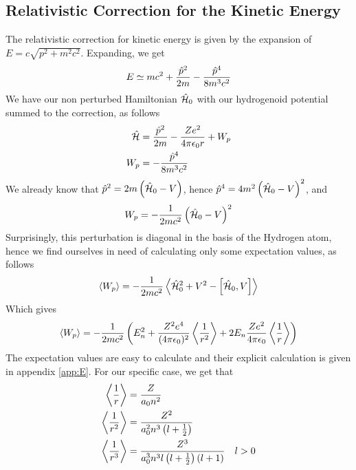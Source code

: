 \documentclass[../qm.tex]{subfiles}
\begin{document}
	\subsection{Relativistic Correction for the Kinetic Energy}
	The relativistic correction for kinetic energy is given by the expansion of $E=c\sqrt{p^2+m^2c^2}$. Expanding, we get
	\begin{equation}
		E\simeq mc^2+\frac{\hat{p}^2}{2m}-\frac{\hat{p}^4}{8m^3c^2}
		\label{eq:energypowerseries}
	\end{equation}
	We have our non perturbed Hamiltonian $\hat{\mathcal{H}}_0$ with our hydrogenoid potential summed to the correction, as follows
	\begin{equation}
		\begin{aligned}
			\hat{\mathcal{H}}&=\frac{\hat{p}^2}{2m}-\frac{Ze^2}{4\pi\epsilon_0r}+W_p\\
			W_p&=-\frac{\hat{p}^4}{8m^3c^2}
		\end{aligned}
		\label{eq:hampluspert}
	\end{equation}
	We already know that $\hat{p}^2=2m\left( \hat{\mathcal{H}}_0-V \right)$, hence $\hat{p}^4=4m^2\left( \hat{\mathcal{H}}_0-V \right)^2$, and
	\begin{equation*}
		W_p=-\frac{1}{2mc^2}\left( \hat{\mathcal{H}}_0-V \right)^2
	\end{equation*}
	Surprisingly, this perturbation is diagonal in the basis of the Hydrogen atom, hence we find ourselves in need of calculating only some expectation values, as follows
	\begin{equation}
		\expval{W_p}=-\frac{1}{2mc^2}\expval{\opr{\ham}_0^2+V^2-\comm{\opr{\ham}_0}{V}}
		\label{eq:evaluationkineticcorr}
	\end{equation}
	Which gives
	\begin{equation}
		\expval{W_p}=-\frac{1}{2mc^2}\left( E_n^2+\frac{Z^2e^4}{(4\pi\epsilon_0)^2}\expval{\frac{1}{r^2}}+2E_n\frac{Ze^2}{4\pi\epsilon_0}\expval{\frac{1}{r}} \right)
		\label{eq:completecalc}
	\end{equation}
	The expectation values are easy to calculate and their explicit calculation is given in appendix \ref{app:E}. For our specific case, we get that
	\begin{equation}
		\begin{aligned}
			\expval{\frac{1}{r}}&=\frac{Z}{a_0n^2}\\
			\expval{\frac{1}{r^2}}&=\frac{Z^2}{a_0^2n^3\left( l+\frac{1}{2} \right)}\\
			\expval{\frac{1}{r^3}}&=\frac{Z^3}{a_0^3n^3l\left( l+\frac{1}{2} \right)\left( l+1 \right)}\quad l>0
		\end{aligned}
		\label{eq:expvalrminusk}
	\end{equation}
\end{document}
